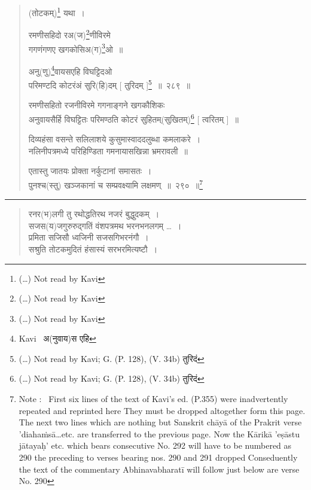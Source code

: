\documentclass[11pt, openany]{book}
\begin{document}
\newpage

\begin{quote}
(तोटकम्)\renewcommand{\thefootnote}{1}\footnote{(\ldots ) Not read by Kavi} यथा~। 

{\qt रमणीसहिदो रअ(ज)\renewcommand{\thefootnote}{2}\footnote{(\ldots ) Not read by Kavi}णीविरमे \\
गगणंगणए खगकोसिअ(ग)\renewcommand{\thefootnote}{3}\footnote{(\ldots ) Not read by Kavi}ओ~॥}

{\na अनु(णु)\renewcommand{\thefootnote}{4}\footnote{Kavi \textendash\ अ(नुवाय)स एहि}वायसएहि विघट्टिदओ\\
परिमण्टदि कोटरंअं सुरि(हि)दम् [ तुरिदम् ]\renewcommand{\thefootnote}{5}\footnote{(\ldots ) Not read by Kavi; G. (P. 128), (V. 34b)
तुरिदं}~॥~२८९~॥}

{\qt रमणीसहितो रजनीविरमे गगनाङ्गने खगकौशिकः \\
अनुवायसैर्हि विघट्टितः परिमण्ठति कोटरं सुहितम्(सुखितम्)\renewcommand{\thefootnote}{6}\footnote{(\ldots ) Not read by Kavi; G. (P. 128), (V. 34b)
तुरिदं} [ त्वरितम् ]~॥

दिव्यहंसा वसन्ते सलिलाशये कुसुमास्वाददलुब्धा कमलाकरे~। \\
नलिनीपत्रमध्ये परिहिण्डिता गमनायासखिन्ना भ्रमरावली~॥} 

{\na एतास्तु जातयः प्रोक्ता नर्कुटानां समासतः~।\\
पुनश्च(स्तु) खञ्जकानां च सम्प्रवक्ष्यामि लक्षमण्~॥~२९०~॥\renewcommand{\thefootnote}{*}\footnote{Note : \textendash\ First six lines of the text of Kavi's ed. (P.355) were inadvertently repeated and reprinted here They must be dropped altogether form this page. The next two lines which are nothing but Sanskrit chāyā of the Prakrit verse 'diahaṁsā\ldots etc. are transferred to the previous page. Now the Kārikā 'eṣāstu jātayaḥ' etc. which bears consecutive No. 292 will have to be numbered as 290 the preceding to verses bearing nos. 290 and 291 dropped Conseduently the text of the commentary Abhinavabharatī will follow just below are verse No. 290}}
\end{quote}

\hrule

\begin{quote}
{\qt रनर(भ)लगी तु रथोद्धतिरथ नजरं बुद्धुदकम्~। \\
 सजस(य)जगुरुरुद्गतिं वंशपत्रमथ भरनभनलगम् \ldots ~।\\
 प्रमिता सजिसौ ध्वजिनी सजसगिभरनंगौ~।\\
 सश्रुति तोटकमुदितं हंसास्यं सरभरमित्यष्टौ~। }
\end{quote}
\end{document}
